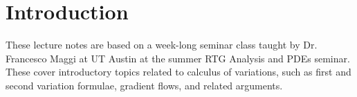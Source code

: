 \documentclass{memoir}
\begin{document}


\chapter{Introduction}
\label{cha:introduction}



These lecture notes are based on a week-long seminar class taught by Dr. Francesco Maggi at UT Austin at the summer RTG Analysis and PDEs seminar. These cover introductory topics related to calculus of variations, such as first and second variation formulae, gradient flows, and related arguments.
\end{document}
